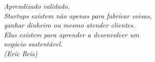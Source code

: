 \begin{epigrafe}
  \vspace*{\fill}
  \begin{flushright}
    \textit{Aprendizado validado. \\
    Startups existem não apenas para fabricar coisas, \\
    ganhar dinheiro ou mesmo atender clientes. \\
    Elas existem para aprender a desenvolver um \\
    negócio sustentável. \\
    (Eric Reis)}
  \end{flushright}
\end{epigrafe}
